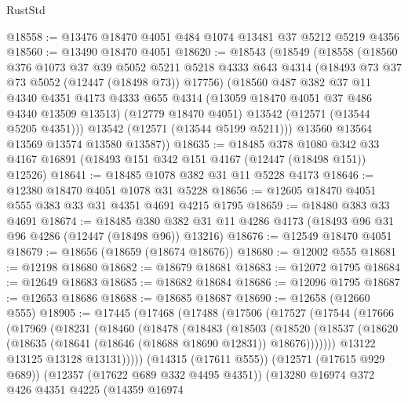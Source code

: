 \begin{lexlean}{RustStd}
\begin{coremodule}
@18558 := @13476 @18470 @4051 @484 @1074 @13481 @37 @5212 @5219 @4356
@18560 := @13490 @18470 @4051
@18620 := @18543
    (@18549
      (@18558
        (@18560
          @376
          @1073
          @37
          @39
          @5052
          @5211
          @5218
          @4333
          @643
          @4314
          (@18493 @73 @37 @73 @5052 (@12447 (@18498 @73)) @17756)
          (@18560
            @487
            @382
            @37
            @11
            @4340
            @4351
            @4173
            @4333
            @655
            @4314
            (@13059 @18470 @4051 @37 @486 @4340 @13509 @13513)
            (@12779 @18470 @4051)
            @13542
            (@12571 (@13544 @5205 @4351)))
          @13542
          (@12571 (@13544 @5199 @5211)))
        @13560
        @13564
        @13569
        @13574
        @13580
        @13587))
@18635 := @18485
    @378
    @1080
    @342
    @33
    @4167
    @16891
    (@18493 @151 @342 @151 @4167 (@12447 (@18498 @151)) @12526)
@18641 := @18485 @1078 @382 @31 @11 @5228 @4173
@18646 := @12380 @18470 @4051 @1078 @31 @5228
@18656 := @12605 @18470 @4051 @555 @383 @33 @31 @4351 @4691 @4215 @1795
@18659 := @18480 @383 @33 @4691
@18674 := @18485
    @380
    @382
    @31
    @11
    @4286
    @4173
    (@18493 @96 @31 @96 @4286 (@12447 (@18498 @96)) @13216)
@18676 := @12549 @18470 @4051
@18679 := @18656 (@18659 (@18674 @18676))
@18680 := @12002 @555
@18681 := @12198 @18680
@18682 := @18679 @18681
@18683 := @12072 @1795
@18684 := @12649 @18683
@18685 := @18682 @18684
@18686 := @12096 @1795
@18687 := @12653 @18686
@18688 := @18685 @18687
@18690 := @12658 (@12660 @555)
@18905 := @17445
    (@17468
      (@17488
        (@17506
          (@17527
            (@17544
              (@17666
                (@17969
                  (@18231
                    (@18460
                      (@18478
                        (@18483
                          (@18503
                            (@18520
                              (@18537
                                (@18620
                                  (@18635 (@18641 (@18646 (@18688 @18690 @12831)) @18676)))))))
                        @13122
                        @13125
                        @13128
                        @13131)))))
              (@14315 (@17611 @555))
              (@12571 (@17615 @929 @689))
              (@12357 (@17622 @689 @332 @4495 @4351))
              (@13280
                @16974
                @372
                @426
                @4351
                @4225
                (@14359
                  @16974

\end{coremodule}
\end{lexlean}

